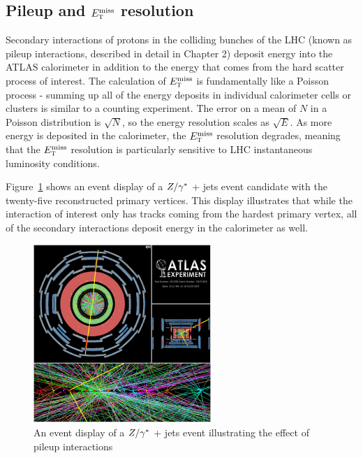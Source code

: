 \subsection{Pileup and $E_{\textrm{\footnotesize\sc t}}^{\rm miss}$ resolution}

Secondary interactions of protons in the colliding bunches of the LHC (known as pileup interactions, described in detail in Chapter 2) deposit energy into the ATLAS calorimeter in addition to the energy that comes from the hard scatter process of interest. The calculation of $E_{\textrm{\footnotesize\sc t}}^{\rm miss}$ is fundamentally like a Poisson process - summing up all of the energy deposits in individual calorimeter cells or clusters is similar to a counting experiment. The error on a mean of $N$ in a Poisson distribution is $\sqrt{N}$, so the energy resolution scales as $\sqrt{E}$. As more energy is deposited in the calorimeter, the $E_{\textrm{\footnotesize\sc t}}^{\rm miss}$ resolution degrades, meaning that the $E_{\textrm{\footnotesize\sc t}}^{\rm miss}$ resolution is particularly sensitive to LHC instantaneous luminosity conditions. 

Figure~\ref{fig:Zjetseventdisplay} shows an event display of a $Z/\gamma^{\ast}$ + jets event candidate with the twenty-five reconstructed primary vertices. This display illustrates that while the interaction of interest only has tracks coming from the hardest primary vertex, all of the secondary interactions  deposit energy in the calorimeter as well.

\begin{figure}[h!]
  \centering
  \captionsetup{justification=centering}

  \includegraphics[width=0.6\textwidth]{figures/Zjets_EventDisplay}
  \caption{An event display of a $Z/\gamma^{\ast}$ + jets event illustrating the effect of pileup interactions}
  \label{fig:Zjetseventdisplay}
\end{figure}

